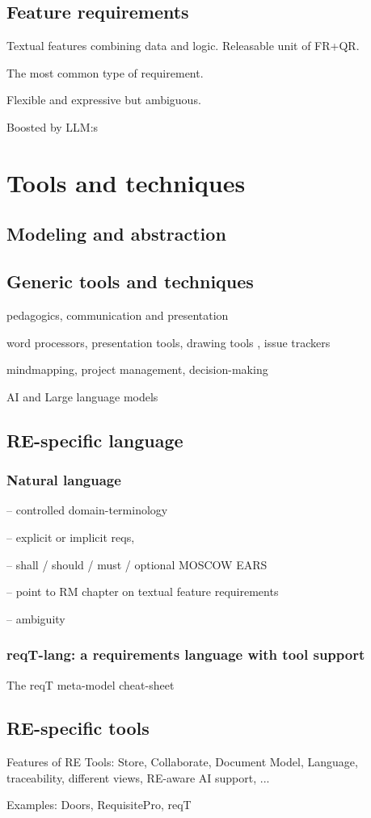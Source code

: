 \subsection{Feature requirements}%

Textual features combining data and logic. Releasable unit of FR+QR.

The most common type of requirement.

Flexible and expressive but ambiguous.

Boosted by LLM:s

\section{Tools and techniques}

\subsection{Modeling and abstraction}

\subsection{Generic tools and techniques}
  pedagogics, communication and presentation

  word processors, presentation tools, drawing tools , issue trackers 

  mindmapping, project management, decision-making

  AI and Large language models 


\subsection{RE-specific language}

\subsubsection{Natural language}

-- controlled domain-terminology 

-- explicit or implicit reqs, 

-- shall / should / must / optional MOSCOW EARS

-- point to RM chapter on textual feature requirements

-- ambiguity

\subsubsection{reqT-lang: a requirements language with tool support}

The reqT meta-model cheat-sheet

\subsection{RE-specific tools}
  Features of RE Tools: Store, Collaborate, Document Model, Language, traceability, different views, RE-aware AI support, ...

  Examples: Doors, RequisitePro, reqT





